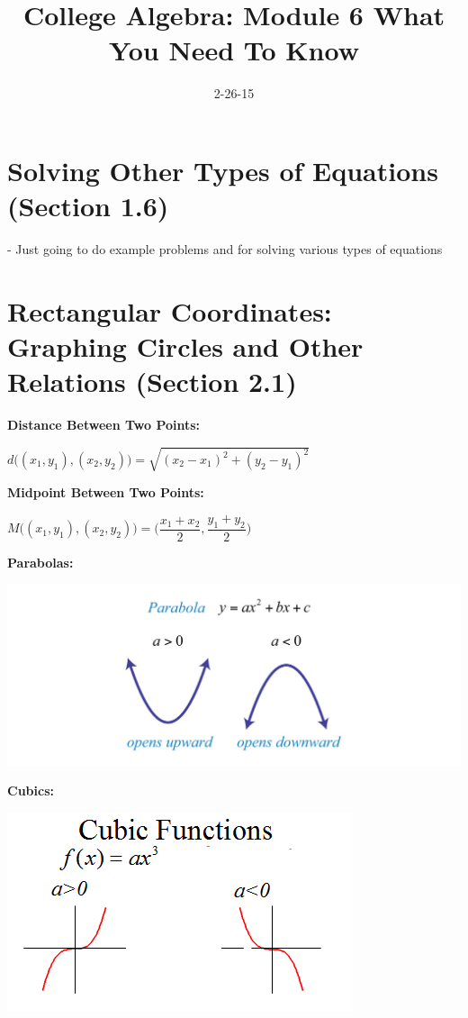 \documentclass[12pt]{article}
\begin{document}
\title{College Algebra: Module 6 What You Need To Know}
\date{2-26-15}
\author{}
\maketitle


\section{Solving Other Types of Equations (Section 1.6)}

- Just going to do example problems and for solving various types of equations


\section{Rectangular Coordinates: Graphing Circles and Other Relations (Section 2.1)}

\textbf{Distance Between Two Points:} 
\newline

\centerline{$d \Big((x_{1},y_{1}),(x_{2},y_{2})\Big) = \sqrt{(x_{2}-x_{1})^2+(y_{2}-y_{1})^2}$}

\textbf{Midpoint Between Two Points:} 
\newline

\centerline{$M \Big((x_{1},y_{1}),(x_{2},y_{2})\Big) =\Big(\dfrac{x_{1}+x_{2}}{2}, \dfrac{y_{1}+y_{2}}{2}\Big)$}

\textbf{Parabolas:} 

\centerline{\includegraphics[scale = 0.3]{Parabola.jpg}}

\newpage

\textbf{Cubics:} 

\centerline{\includegraphics{Cubic.png}}
\end{document}
